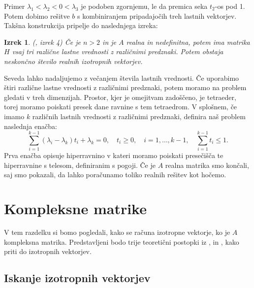 \documentclass[12pt,a4paper]{amsart}
\theoremstyle{definition}
\theoremstyle{plain}
\newtheorem{izrek}[definicija]{Izrek}
\begin{document}
Primer $\lambda_1 <\lambda_2<0<\lambda_3$ je podoben zgornjemu, le da premica seka $t_2$-os pod 1. Potem dobimo rešitve $b$ s kombiniranjem pripadajočih treh lastnih vektorjev. %
Takšna konstrukcija pripelje do naslednjega izreka:
\begin{izrek} (\cite{meurant}, izrek 4)
Če je $n>2$ in je $A$ realna in nedefinitna, potem ima matrika $H$ vsaj tri različne lastne vrednosti z različnimi predznaki. Potem obstaja neskončno število realnih izotropnih vektorjev. 
\end{izrek}
Seveda lahko nadaljujemo z večanjem števila lastnih vrednosti. Če uporabimo štiri različne lastne vrednosti z različnimi predznaki, potem moramo na problem gledati v treh dimenzijah. Prostor, kjer je omejitvam zadoščeno, je tetraeder, torej moramo poiskati presek dane ravnine s tem tetraedrom. 
V splošnem, če imamo $k$ različnih lastnih vrednosti z različnimi predznaki, definira naš problem naslednja enačba:
\begin{equation}
\sum_{i=1}^{k-1} (\lambda_i -\lambda_k)t_i +\lambda_k =0,\quad t_i\ge0,\quad i=1,\dots,k-1,\quad \sum_{i=1}^{k-1}t_i \le1.
\end{equation}
Prva enačba opisuje hiperravnino v kateri moramo poiskati  presečišča te hiperravnine s telesom, definiranim s pogoji.
Če je $A$ realna matrika smo končali, saj smo pokazali, da lahko poračunamo toliko realnih rešitev kot hočemo.

\section{Kompleksne matrike}
V tem razdelku si bomo pogledali, kako se računa izotropne vektorje, ko je $A$ kompleksna matrika. Predstavljeni bodo trije teoretični postopki iz \cite{meurant},\cite{carden} in \cite{trije}, kako priti do izotropnih vektorjev.
\subsection{Iskanje izotropnih vektorjev}
\end{document}
